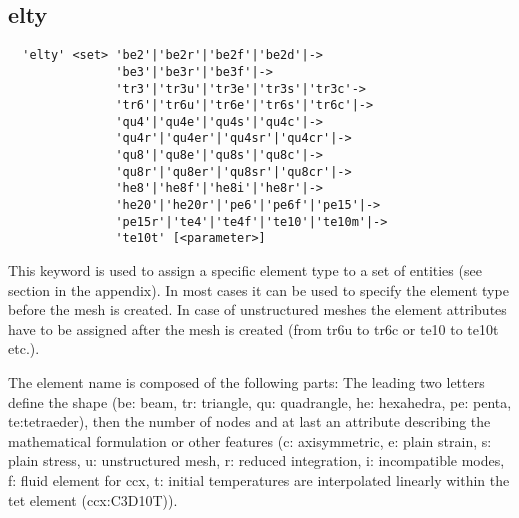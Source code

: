 \documentclass{article}
\begin{document}
\subsection{\label{elty}elty}
\begin{verbatim}
  'elty' <set> 'be2'|'be2r'|'be2f'|'be2d'|->
               'be3'|'be3r'|'be3f'|->
               'tr3'|'tr3u'|'tr3e'|'tr3s'|'tr3c'->
               'tr6'|'tr6u'|'tr6e'|'tr6s'|'tr6c'|->
               'qu4'|'qu4e'|'qu4s'|'qu4c'|->
               'qu4r'|'qu4er'|'qu4sr'|'qu4cr'|->
               'qu8'|'qu8e'|'qu8s'|'qu8c'|->
               'qu8r'|'qu8er'|'qu8sr'|'qu8cr'|->
               'he8'|'he8f'|'he8i'|'he8r'|->
               'he20'|'he20r'|'pe6'|'pe6f'|'pe15'|->
               'pe15r'|'te4'|'te4f'|'te10'|'te10m'|->
               'te10t' [<parameter>]
\end{verbatim}
This keyword is used to assign a specific element type to a set of entities
(see section  in the appendix). In most
cases it can be used to specify the element type before the mesh is
created. In case of unstructured meshes the element attributes have to be
assigned after the mesh is created (from tr6u to tr6c or te10 to te10t etc.). 

The element name is composed of the following parts: The leading two letters
define the shape (be: beam, tr: triangle, qu: quadrangle, he: hexahedra, pe:
penta, te:tetraeder), then the number of nodes and at last an attribute
describing the mathematical formulation or other features (c: axisymmetric, e: plain strain, s: plain
stress, u: unstructured mesh, r: reduced integration, i: incompatible modes,
f: fluid element for ccx, t: initial temperatures are interpolated linearly
within the tet element (ccx:C3D10T)).
\end{document}
